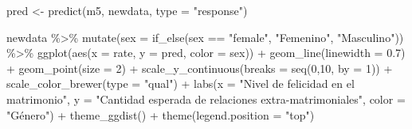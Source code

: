 \documentclass[
  12pt,
  a4paper,
]{article}
\newenvironment{Shaded}{\begin{snugshade}}{\end{snugshade}}
\newcommand{\AttributeTok}[1]{\textcolor[rgb]{0.77,0.63,0.00}{#1}}
\newcommand{\DecValTok}[1]{\textcolor[rgb]{0.00,0.00,0.81}{#1}}
\newcommand{\FloatTok}[1]{\textcolor[rgb]{0.00,0.00,0.81}{#1}}
\newcommand{\FunctionTok}[1]{\textcolor[rgb]{0.00,0.00,0.00}{#1}}
\newcommand{\NormalTok}[1]{#1}
\newcommand{\OtherTok}[1]{\textcolor[rgb]{0.56,0.35,0.01}{#1}}
\newcommand{\SpecialCharTok}[1]{\textcolor[rgb]{0.00,0.00,0.00}{#1}}
\newcommand{\StringTok}[1]{\textcolor[rgb]{0.31,0.60,0.02}{#1}}
\begin{document}
\begin{Shaded}
\begin{Highlighting}[]
\NormalTok{pred }\OtherTok{\textless{}{-}} \FunctionTok{predict}\NormalTok{(m5, newdata, }\AttributeTok{type =} \StringTok{"response"}\NormalTok{)}

\NormalTok{newdata }\SpecialCharTok{\%\textgreater{}\%} 
  \FunctionTok{mutate}\NormalTok{(}\AttributeTok{sex =} \FunctionTok{if\_else}\NormalTok{(sex }\SpecialCharTok{==} \StringTok{"female"}\NormalTok{, }\StringTok{"Femenino"}\NormalTok{, }\StringTok{"Masculino"}\NormalTok{)) }\SpecialCharTok{\%\textgreater{}\%} 
  \FunctionTok{ggplot}\NormalTok{(}\FunctionTok{aes}\NormalTok{(}\AttributeTok{x =}\NormalTok{ rate, }\AttributeTok{y =}\NormalTok{ pred, }\AttributeTok{color =}\NormalTok{ sex)) }\SpecialCharTok{+}
  \FunctionTok{geom\_line}\NormalTok{(}\AttributeTok{linewidth =} \FloatTok{0.7}\NormalTok{) }\SpecialCharTok{+}
  \FunctionTok{geom\_point}\NormalTok{(}\AttributeTok{size =} \DecValTok{2}\NormalTok{) }\SpecialCharTok{+}
  \FunctionTok{scale\_y\_continuous}\NormalTok{(}\AttributeTok{breaks =} \FunctionTok{seq}\NormalTok{(}\DecValTok{0}\NormalTok{,}\DecValTok{10}\NormalTok{, }\AttributeTok{by =} \DecValTok{1}\NormalTok{)) }\SpecialCharTok{+}
  \FunctionTok{scale\_color\_brewer}\NormalTok{(}\AttributeTok{type =} \StringTok{"qual"}\NormalTok{) }\SpecialCharTok{+}
   \FunctionTok{labs}\NormalTok{(}\AttributeTok{x =} \StringTok{"Nivel de felicidad en el matrimonio"}\NormalTok{, }
       \AttributeTok{y =} \StringTok{"Cantidad esperada de relaciones extra{-}matrimoniales"}\NormalTok{, }
       \AttributeTok{color =} \StringTok{"Género"}\NormalTok{) }\SpecialCharTok{+}
  \FunctionTok{theme\_ggdist}\NormalTok{() }\SpecialCharTok{+}
  \FunctionTok{theme}\NormalTok{(}\AttributeTok{legend.position =} \StringTok{"top"}\NormalTok{)}
\end{Highlighting}
\end{Shaded}
\end{document}

